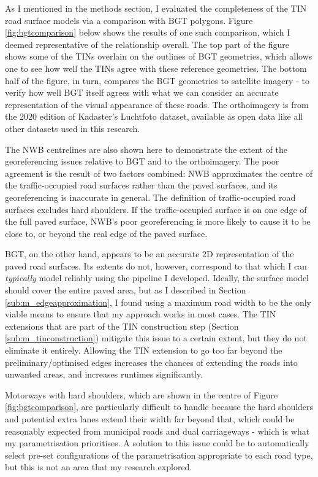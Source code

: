 As I mentioned in the methods section, I evaluated the completeness of the TIN road surface models via a comparison with BGT polygons. Figure \ref{fig:bgtcomparison} below shows the results of one such comparison, which I deemed representative of the relationship overall. The top part of the figure shows some of the TINs overlain on the outlines of BGT geometries, which allows one to see how well the TINs agree with these reference geometries. The bottom half of the figure, in turn, compares the BGT geometries to satellite imagery - to verify how well BGT itself agrees with what we can consider an accurate representation of the visual appearance of these roads. The orthoimagery is from the 2020 edition of Kadaster's Luchtfoto dataset, available as open data like all other datasets used in this research.

The NWB centrelines are also shown here to demonstrate the extent of the georeferencing issues relative to BGT and to the orthoimagery. The poor agreement is the result of two factors combined: NWB approximates the centre of the traffic-occupied road surfaces rather than the paved surfaces, and its georeferencing is inaccurate in general. The definition of traffic-occupied road surfaces excludes hard shoulders. If the traffic-occupied surface is on one edge of the full paved surface, NWB's poor georeferencing is more likely to cause it to be close to, or beyond the real edge of the paved surface.

BGT, on the other hand, appears to be an accurate 2D representation of the paved road surfaces. Its extents do not, however, correspond to that which I can \textit{typically} model reliably using the pipeline I developed. Ideally, the surface model should cover the entire paved area, but as I described in Section \ref{sub:m_edgeapproximation}, I found using a maximum road width to be the only viable means to ensure that my approach works in most cases. The TIN extensions that are part of the TIN construction step (Section \ref{sub:m_tinconstruction}) mitigate this issue to a certain extent, but they do not eliminate it entirely. Allowing the TIN extension to go too far beyond the preliminary/optimised edges increases the chances of extending the roads into unwanted areas, and increases runtimes significantly.

Motorways with hard shoulders, which are shown in the centre of Figure \ref{fig:bgtcomparison}, are particularly difficult to handle because the hard shoulders and potential extra lanes extend their width far beyond that, which could be reasonably expected from municipal roads and dual carriageways - which is what my parametrisation prioritises. A solution to this issue could be to automatically select pre-set configurations of the parametrisation appropriate to each road type, but this is not an area that my research explored.


